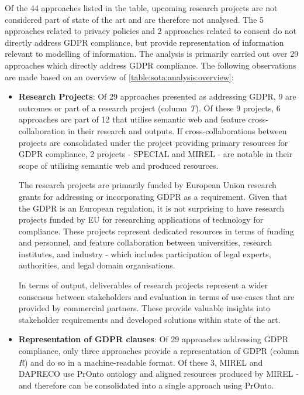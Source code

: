 Of the 44 approaches listed in the table, upcoming research projects are not considered part of state of the art and are therefore not analysed. The 5 approaches related to privacy policies and 2 approaches related to consent do not directly address GDPR compliance, but provide representation of information relevant to modelling of information. The analysis is primarily carried out over 29 approaches which directly address GDPR compliance.
The following observations are made based on an overview of \autoref{table:sota:analysis:overview}:
\begin{itemize}
    \item \textbf{Research Projects}: Of 29 approaches presented as addressing GDPR, 9 are outcomes or part of a research project (column \textit{T}). Of these 9 projects, 6 approaches are part of 12 that utilise semantic web and feature cross-collaboration in their research and outputs. If cross-collaborations between projects are consolidated under the project providing primary resources for GDPR compliance, 2 projects - SPECIAL and MIREL - are notable in their scope of utilising semantic web and produced resources. 
    
    The research projects are primarily funded by European Union research grants for addressing or incorporating GDPR as a requirement. Given that the GDPR is an European regulation, it is not surprising to have research projects funded by EU for researching applications of technology for compliance. These projects represent dedicated resources in terms of funding and personnel, and feature collaboration between universities, research institutes, and industry - which includes participation of legal experts, authorities, and legal domain organisations.

    In terms of output, deliverables of research projects represent a wider consensus between stakeholders and evaluation in terms of use-cases that are provided by commercial partners.
    These provide valuable insights into stakeholder requirements and developed solutions within state of the art.

    \item \textbf{Representation of GDPR clauses}: Of 29 approaches addressing GDPR compliance, only three approaches provide a representation of GDPR (column \textit{R}) and do so in a machine-readable format.
    Of these 3, MIREL and DAPRECO use PrOnto ontology and aligned resources produced by MIREL - and therefore can be consolidated into a single approach using PrOnto.
    

\end{itemize}
